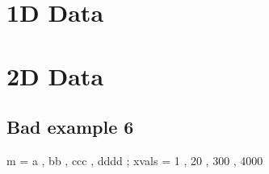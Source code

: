 \documentclass[12pt]{article}
\begin{document}


\section{1D Data}



\section{2D Data}

%
%
%
%
%
%
%
%
%
%


\subsection{Bad example 6}

\begin{functable}
    m     = a , bb , ccc , dddd ;
    xvals = 1 , 20 , 300 , 4000 
\end{functable}
\end{document}
